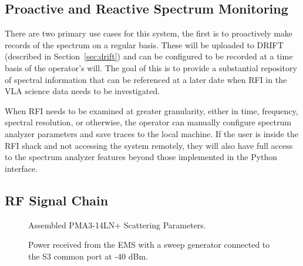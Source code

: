 \documentclass[titlepage]{article}
\begin{document}
\subsection{Proactive and Reactive Spectrum Monitoring}
There are two primary use cases for this system, the first is to proactively make records of the spectrum on a regular basis. These will be uploaded to DRIFT (described in Section~\ref{sec:drift}) and can be configured to be recorded at a time basis of the operator's will. The goal of this is to provide a substantial repository of spectral information that can be referenced at a later date when RFI in the VLA science data needs to be investigated.

When RFI needs to be examined at greater granularity, either in time, frequency, spectral resolution, or otherwise, the operator can manually configure spectrum analyzer parameters and save traces to the local machine. If the user is inside the RFI shack and not accessing the system remotely, they will also have full access to the spectrum analyzer features beyond those implemented in the Python interface.

\subsection{RF Signal Chain}\label{sec:rfchain}

\begin{figure}[!htb]
  \begin{center}
      
  \end{center}
  \caption{Assembled PMA3-14LN+ Scattering Parameters.}\label{fig:pma3}
\end{figure}

\begin{figure}[!htb]
  \begin{center}
      
  \end{center}
  \caption{Power received from the EMS with a sweep generator connected to the S3 common port at -40 dBm.}\label{fig:emsgain}
\end{figure}
\end{document}
